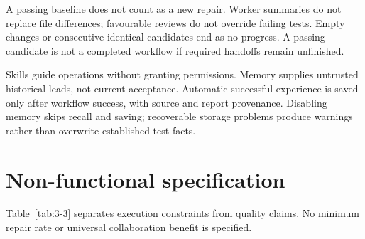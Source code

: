 A passing baseline does not count as a new repair. Worker summaries do not replace file differences; favourable reviews do not override failing tests. Empty changes or consecutive identical candidates end as no progress. A passing candidate is not a completed workflow if required handoffs remain unfinished.

Skills guide operations without granting permissions. Memory supplies untrusted historical leads, not current acceptance. Automatic successful experience is saved only after workflow success, with source and report provenance. Disabling memory skips recall and saving; recoverable storage problems produce warnings rather than overwrite established test facts.

\section{Non-functional specification}\label{sec:3.3}

Table~\ref{tab:3-3} separates execution constraints from quality claims. No minimum repair rate or universal collaboration benefit is specified.

